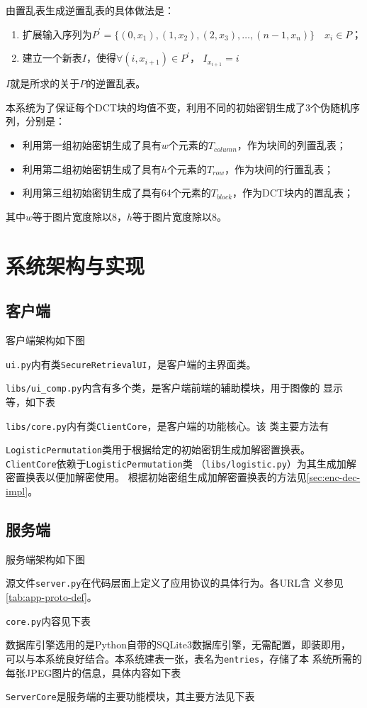 由置乱表生成逆置乱表的具体做法是：
\begin{enumerate}
  \item 扩展输入序列为$P^\prime = \{(0, x_1), (1, x_2), (2, x_3),
      \dotsc, (n - 1, x_n)\} \quad x_i \in P$；
  \item 建立一个新表$I$，使得$\forall (i, x_{i + 1}) \in P^\prime$，
      $I_{x_{i + 1}} = i$
\end{enumerate}
$I$就是所求的关于$P$的逆置乱表。

本系统为了保证每个DCT块的均值不变，利用不同的初始密钥生成了3个伪随机序列，分别是：
\begin{itemize}
  \item 利用第一组初始密钥生成了具有$w$个元素的$T_{column}$，作为块间的列置乱表；
  \item 利用第二组初始密钥生成了具有$h$个元素的$T_{row}$，作为块间的行置乱表；
  \item 利用第三组初始密钥生成了具有64个元素的$T_{block}$，作为DCT块内的置乱表；
\end{itemize}
其中$w$等于图片宽度除以$8$，$h$等于图片宽度除以$8$。

\section{系统架构与实现}
\label{sec:sys-arch}
\subsection{客户端}
客户端架构如下图


\texttt{ui.py}内有类\texttt{SecureRetrievalUI}，是客户端的主界面类。

\texttt{libs/ui\_comp.py}内含有多个类，是客户端前端的辅助模块，用于图像的
显示等，如下表


\texttt{libs/core.py}内有类\texttt{ClientCore}，是客户端的功能核心。该
类主要方法有


\texttt{LogisticPermutation}类用于根据给定的初始密钥生成加解密置换表。
\texttt{ClientCore}依赖于\texttt{LogisticPermutation}类
（\texttt{libs/logistic.py}）为其生成加解密置换表以便加解密使用。
根据初始密组生成加解密置换表的方法见\ref{sec:enc-dec-impl}。

\subsection{服务端}
服务端架构如下图


源文件\texttt{server.py}在代码层面上定义了应用协议的具体行为。各URL含
义参见\ref{tab:app-proto-def}。

\texttt{core.py}内容见下表


数据库引擎选用的是Python自带的SQLite3数据库引擎，无需配置，即装即用，
可以与本系统良好结合。本系统建表一张，表名为\texttt{entries}，存储了本
系统所需的每张JPEG图片的信息，具体内容如下表


\texttt{ServerCore}是服务端的主要功能模块，其主要方法见下表


